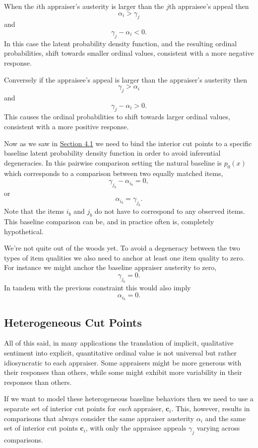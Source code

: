 \documentclass[
  letterpaper,
  DIV=11,
  numbers=noendperiod]{scrartcl}
\begin{document}
When the \(i\)th appraiser's austerity is larger than the \(j\)th
appraisee's appeal then \[
\alpha_{i} > \gamma_{j}
\] and \[
\gamma_{j} - \alpha_{i} < 0.
\] In this case the latent probability density function, and the
resulting ordinal probabilities, shift towards smaller ordinal values,
consistent with a more negative response.

Conversely if the appraisee's appeal is larger than the appraiser's
austerity then \[
\gamma_{j} > \alpha_{i}
\] and \[
\gamma_{j} - \alpha_{i} > 0.
\] This causes the ordinal probabilities to shift towards larger ordinal
values, consistent with a more positive response.

Now as we saw in \hyperref[non-ident]{Section 4.1} we need to bind the
interior cut points to a specific baseline latent probability density
function in order to avoid inferential degeneracies. In this pairwise
comparison setting the natural baseline is \(p_{0}(x)\) which
corresponds to a comparison between two equally matched items, \[
\gamma_{j_{b}} - \alpha_{i_{b}} = 0,
\] or \[
\alpha_{i_{b}} = \gamma_{j_{b}}.
\] Note that the items \(i_{b}\) and \(j_{b}\) do not have to correspond
to any observed items. This baseline comparison can be, and in practice
often is, completely hypothetical.

We're not quite out of the woods yet. To avoid a degeneracy between the
two types of item qualities we also need to anchor at least one item
quality to zero. For instance we might anchor the baseline appraiser
austerity to zero, \[
\gamma_{j_{b}} = 0.
\] In tandem with the previous constraint this would also imply \[
\alpha_{i_{b}} = 0.
\]

\subsection{Heterogeneous Cut Points}\label{heterogeneous-cut-points}

All of this said, in many applications the translation of implicit,
qualitative sentiment into explicit, quantitative ordinal value is not
universal but rather idiosyncratic to each appraiser. Some appraisers
might be more generous with their responses than others, while some
might exhibit more variability in their responses than others.

If we want to model these heterogeneous baseline behaviors then we need
to use a separate set of interior cut points for \emph{each} appraiser,
\(\mathbf{c}_{i}\). This, however, results in comparisons that always
consider the same appraiser austerity \(\alpha_{i}\) and the same set of
interior cut points \(\mathbf{c}_{i}\), with only the appraisee appeals
\(\gamma_{j}\) varying across comparisons.
\end{document}

